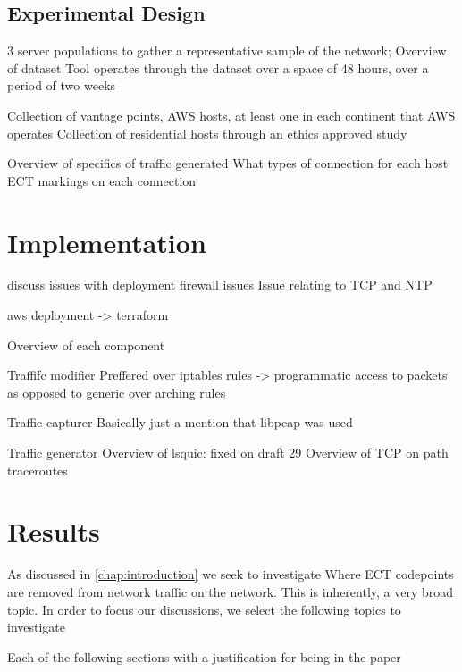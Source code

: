 \documentclass{l4proj}
\begin{document}
\section{Experimental Design}

{{3 server populations to gather a representative sample of the network; Overview of dataset}}
{{Tool operates through the dataset over a space of 48 hours, over a period of two weeks}}


{{Collection of vantage points, AWS hosts, at least one in each continent that AWS operates}}
{{Collection of residential hosts through an ethics approved study}}


{{Overview of specifics of traffic generated}}
{{What types of connection for each host}}
{{ECT markings on each connection}}


\chapter{Implementation}

discuss issues with deployment
firewall issues
Issue relating to TCP and NTP

aws deployment -> terraform

{{Overview of each component}}

{{Traffifc modifier}}
{{Preffered over iptables rules -> programmatic access to packets as opposed to generic over arching rules}}

{{Traffic capturer}}
{{Basically just a mention that libpcap was used}}

{{Traffic generator}}
{{Overview of lsquic: fixed on draft 29}}
{{Overview of TCP on path traceroutes}}

\chapter{Results} 

As discussed in \autoref{chap:introduction} we seek to investigate Where ECT codepoints are removed from network traffic on the network. This is inherently, a very broad topic. In order to focus our discussions, we select the following topics to investigate

{{Each of the following sections with a justification for being in the paper}}
\end{document}
